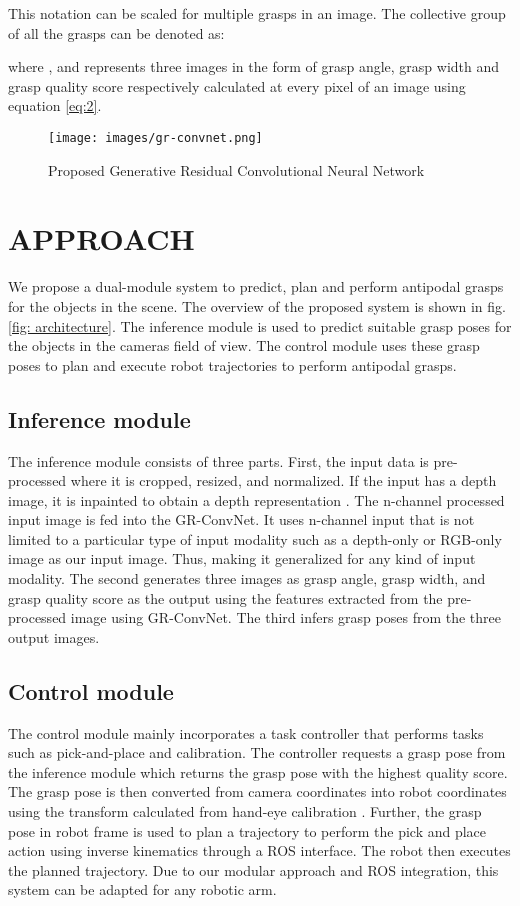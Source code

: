\documentclass[letterpaper, 10pt, conference]{IEEEtran}
\begin{document}
This notation can be scaled for multiple grasps in an image. The collective group of all the grasps can be denoted as:

where , and  represents three images in the form of grasp angle, grasp width and grasp quality score respectively calculated at every pixel of an image using equation \eqref{eq:2}. 



\begin{figure*}
    \centering
    \vspace*{0.2cm}
    \texttt{[image: images/gr-convnet.png]}
    \caption{Proposed Generative Residual Convolutional Neural Network}
    \label{fig: network}
\end{figure*}

\section{APPROACH}


We propose a dual-module system to predict, plan and perform antipodal grasps for the objects in the scene. The overview of the proposed system is shown in fig.\ref{fig: architecture}. The inference module is used to predict suitable grasp poses for the objects in the camera\textquotesingle s field of view. The control module uses these grasp poses to plan and execute robot trajectories to perform antipodal grasps.

\subsection{Inference module}
The inference module consists of three parts. First, the input data is pre-processed where it is cropped, resized, and normalized. If the input has a depth image, it is inpainted to obtain a depth representation \cite{xue2017depth}. The  n-channel processed input image is fed into the GR-ConvNet. It uses n-channel input that is not limited to a particular type of input modality such as a depth-only or RGB-only image as our input image. Thus, making it generalized for any kind of input modality. The second generates three images as grasp angle, grasp width, and grasp quality score as the output using the features extracted from the pre-processed image using GR-ConvNet. The third infers grasp poses from the three output images.

\subsection{Control module}
The control module mainly incorporates a task controller that performs tasks such as pick-and-place and calibration. The controller requests a grasp pose from the inference module which returns the grasp pose with the highest quality score. The grasp pose is then converted from camera coordinates into robot coordinates using the transform calculated from hand-eye calibration \cite{strobl2006optimal}. Further, the grasp pose in robot frame is used to plan a trajectory to perform the pick and place action using inverse kinematics through a ROS interface. The robot then executes the planned trajectory. Due to our modular approach and ROS integration, this system can be adapted for any robotic arm.
\end{document}
